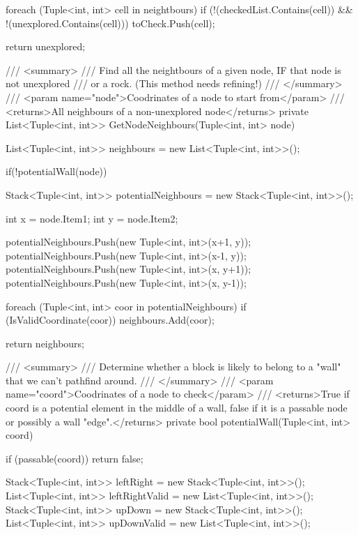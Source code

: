 \documentclass[11pt]{article}
\begin{document}
\begin{code}
{{{{                foreach (Tuple<int, int> cell in neightbours)
                {
                    if (!(checkedList.Contains(cell))
                        && !(unexplored.Contains(cell)))
                    {
                        toCheck.Push(cell);
                    }
                }
            }

            return unexplored;
        }

        /// <summary>
        /// Find all the neightbours of a given node, IF that node is not unexplored
        /// or a rock. (This method needs refining!)
        /// </summary>
        /// <param name="node">Coodrinates of a node to start from</param>
        /// <returns>All neighbours of a non-unexplored node</returns>
        private List<Tuple<int, int>> GetNodeNeighbours(Tuple<int, int> node)
        {
            List<Tuple<int, int>> neighbours = new List<Tuple<int, int>>();

           
            if(!potentialWall(node))
            {
                Stack<Tuple<int, int>> potentialNeighbours
                    = new Stack<Tuple<int, int>>();

                int x = node.Item1;
                int y = node.Item2;

                potentialNeighbours.Push(new Tuple<int, int>(x+1, y));
                potentialNeighbours.Push(new Tuple<int, int>(x-1, y));
                potentialNeighbours.Push(new Tuple<int, int>(x, y+1));
                potentialNeighbours.Push(new Tuple<int, int>(x, y-1));

                foreach (Tuple<int, int> coor in potentialNeighbours)
                {
                    if (IsValidCoordinate(coor))
                    {
                        neighbours.Add(coor);
                    }
                }
            }

            return neighbours;
        }

        /// <summary>
        /// Determine whether a block is likely to belong to a "wall" that we can't pathfind around.
        /// </summary>
        /// <param name="coord">Coodrinates of a node to check</param>
        /// <returns>True if coord is a potential element in the middle of a wall, false if it is a passable node or possibly a wall "edge".</returns>
        private bool potentialWall(Tuple<int, int> coord)
        {
            if (passable(coord))
            {
                return false;
            }

            Stack<Tuple<int, int>> leftRight = new Stack<Tuple<int, int>>();
            List<Tuple<int, int>> leftRightValid = new List<Tuple<int, int>>();
            Stack<Tuple<int, int>> upDown = new Stack<Tuple<int, int>>();
            List<Tuple<int, int>> upDownValid = new List<Tuple<int, int>>();

}}}
\end{code}
\end{document}
